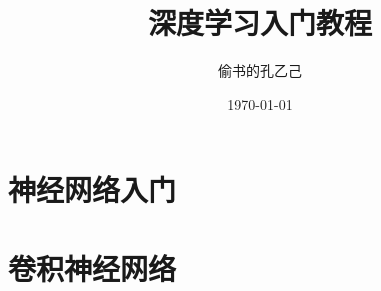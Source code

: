 \documentclass[fontset=fandol]{template}
\title{深度学习入门教程}
\author{偷书的孔乙己}
\date{\today}
\begin{document}


\frontmatter



\tableofcontents

\mainmatter

\part{神经网络入门}





\part{卷积神经网络}







% 
% 
% 
% 
% 
% 
% 
% 
% 

% 
% 
% 
% 
% 
% 
% 
% 

\backmatter

\end{document}
